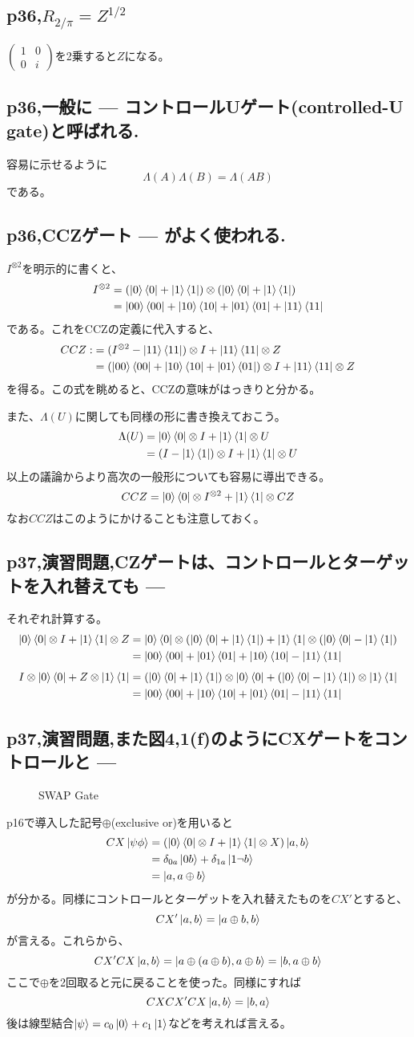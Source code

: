 \documentclass[b5paper,fleqn]{ltjsarticle}
\newcommand\s[1]{\subsection*{#1}\noindent\ignorespaces}
\newcommand\al[1]{\begin{align*}#1\end{align*}}
\newcommand\mat[2]{\left(\begin{array}{#1}#2\end{array}\right)}
\newcommand\qcirc[2]{\begin{figure}[H]\centerline{\Qcircuit{#1}}\caption{#2}\end{figure}}
\begin{document}
\s{p36,$R_{2/\pi}=Z^{1/2}$}
$\mat{cc}{1&0\\0&i}$を2乗すると$Z$になる。
\s{p36,一般に --- コントロールUゲート(controlled-U gate)と呼ばれる.}
容易に示せるように
\[\Lambda(A)\Lambda(B)=\Lambda(AB)\]
である。
\s{p36,CCZゲート --- がよく使われる.}
$I^{\otimes2}$を明示的に書くと、
\al{
  I^{\otimes2}
&=(\ket{0}\bra{0}+\ket{1}\bra{1})\otimes(\ket{0}\bra{0}+\ket{1}\bra{1})\\
&=\ket{00}\bra{00}+\ket{10}\bra{10}+\ket{01}\bra{01}+\ket{11}\bra{11}
}である。これをCCZの定義に代入すると、
\al{
CCZ:&=(I^{\otimes 2}-\ket{11}\bra{11})\otimes I+\ket{11}\bra{11}\otimes Z\\
&=(\ket{00}\bra{00}+\ket{10}\bra{10}+\ket{01}\bra{01})\otimes I+\ket{11}\bra{11}\otimes Z
}を得る。この式を眺めると、CCZの意味がはっきりと分かる。\par
また、$\Lambda(U)$に関しても同様の形に書き換えておこう。
\al{\Lambda(U)
&=\ket{0}\bra{0}\otimes I+\ket{1}\bra{1}\otimes U\\
&=(I-\ket{1}\bra{1})\otimes I+\ket{1}\bra{1}\otimes U
}
以上の議論からより高次の一般形についても容易に導出できる。
\[CCZ=\ket{0}\bra{0}\otimes I^{\otimes 2}+\ket{1}\bra{1}\otimes CZ\]
なお$CCZ$はこのようにかけることも注意しておく。

\s{p37,演習問題,CZゲートは、コントロールとターゲットを入れ替えても ---}
それぞれ計算する。
\al{
\ket{0}\bra{0}\otimes I+\ket{1}\bra{1}\otimes Z
&=\ket{0}\bra{0}\otimes(\ket{0}\bra{0}+\ket{1}\bra{1})+\ket{1}\bra{1}\otimes
(\ket{0}\bra{0}-\ket{1}\bra{1})\\
&=\ket{00}\bra{00}+\ket{01}\bra{01}+\ket{10}\bra{10}-\ket{11}\bra{11}
}
\al{
I\otimes\ket{0}\bra{0}+Z\otimes\ket{1}\bra{1}
&=(\ket{0}\bra{0}+\ket{1}\bra{1})\otimes\ket{0}\bra{0}+(\ket{0}\bra{0}-\ket{1}\bra{1})\otimes\ket{1}\bra{1}\\
&=\ket{00}\bra{00}+\ket{10}\bra{10}+\ket{01}\bra{01}-\ket{11}\bra{11}
}
\s{p37,演習問題,また図4,1(f)のようにCXゲートをコントロールと ---}
\qcirc{
& \ctrl{1} & \targ     & \ctrl{1} & \qw \\
& \targ    & \ctrl{-1} & \targ     & \qw
}{SWAP Gate}
p16で導入した記号$\oplus$(exclusive or)を用いると
\al{CX\ket{\psi\phi}&=(\ket{0}\bra{0}\otimes I+\ket{1}\bra{1}\otimes X)\ket{a,b}\\
&=\delta_{0a}\ket{0b}+\delta_{1a}\ket{1\lnot b}\\
&=\ket{a,a\oplus b}
}
が分かる。同様にコントロールとターゲットを入れ替えたものを$CX'$とすると、
\[CX'\ket{a,b}=\ket{a\oplus b,b}\]が言える。これらから、
\[CX'CX\ket{a,b}=\ket{a\oplus(a\oplus b),a\oplus b}=\ket{b,a\oplus b}\]
ここで$\oplus$を2回取ると元に戻ることを使った。同様にすれば
\[CXCX'CX\ket{a,b}=\ket{b,a}\]
後は線型結合$\ket{\psi}=c_0\ket{0}+c_1\ket{1}$などを考えれば言える。
\end{document}
